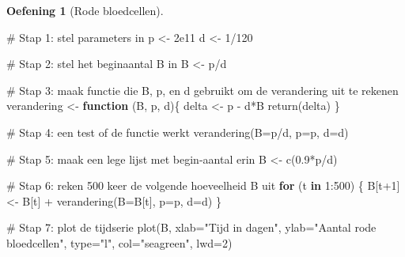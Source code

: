 \documentclass[
  a4paper,
]{scrbook}
\newenvironment{Shaded}{\begin{snugshade}}{\end{snugshade}}
\newcommand{\AttributeTok}[1]{\textcolor[rgb]{0.40,0.45,0.13}{#1}}
\newcommand{\CommentTok}[1]{\textcolor[rgb]{0.37,0.37,0.37}{#1}}
\newcommand{\ControlFlowTok}[1]{\textcolor[rgb]{0.00,0.23,0.31}{\textbf{#1}}}
\newcommand{\DecValTok}[1]{\textcolor[rgb]{0.68,0.00,0.00}{#1}}
\newcommand{\FloatTok}[1]{\textcolor[rgb]{0.68,0.00,0.00}{#1}}
\newcommand{\FunctionTok}[1]{\textcolor[rgb]{0.28,0.35,0.67}{#1}}
\newcommand{\NormalTok}[1]{\textcolor[rgb]{0.00,0.23,0.31}{#1}}
\newcommand{\OtherTok}[1]{\textcolor[rgb]{0.00,0.23,0.31}{#1}}
\newcommand{\SpecialCharTok}[1]{\textcolor[rgb]{0.37,0.37,0.37}{#1}}
\newcommand{\StringTok}[1]{\textcolor[rgb]{0.13,0.47,0.30}{#1}}
\theoremstyle{definition}
\newtheorem{exercise}{Oefening}[chapter]
\theoremstyle{remark}
\begin{document}
\begin{exercise}[Rode
bloedcellen]
\begin{Shaded}
\begin{Highlighting}[]
\CommentTok{\# Stap 1: stel parameters in}
\NormalTok{p }\OtherTok{\textless{}{-}} \FloatTok{2e11}    
\NormalTok{d }\OtherTok{\textless{}{-}} \DecValTok{1}\SpecialCharTok{/}\DecValTok{120}   

\CommentTok{\# Stap 2: stel het beginaantal B in}
\NormalTok{B }\OtherTok{\textless{}{-}}\NormalTok{ p}\SpecialCharTok{/}\NormalTok{d}

\CommentTok{\# Stap 3: maak functie die B, p, en d gebruikt om de verandering uit te rekenen}
\NormalTok{verandering }\OtherTok{\textless{}{-}} \ControlFlowTok{function}\NormalTok{ (B, p, d)\{}
\NormalTok{  delta }\OtherTok{\textless{}{-}}\NormalTok{ p }\SpecialCharTok{{-}}\NormalTok{ d}\SpecialCharTok{*}\NormalTok{B}
  \FunctionTok{return}\NormalTok{(delta)}
\NormalTok{\}}

\CommentTok{\# Stap 4: een test of de functie werkt}
\FunctionTok{verandering}\NormalTok{(}\AttributeTok{B=}\NormalTok{p}\SpecialCharTok{/}\NormalTok{d, }\AttributeTok{p=}\NormalTok{p, }\AttributeTok{d=}\NormalTok{d) }

\CommentTok{\# Stap 5: maak een lege lijst met begin{-}aantal erin}
\NormalTok{B }\OtherTok{\textless{}{-}} \FunctionTok{c}\NormalTok{(}\FloatTok{0.9}\SpecialCharTok{*}\NormalTok{p}\SpecialCharTok{/}\NormalTok{d)}

\CommentTok{\# Stap 6: reken 500 keer de volgende hoeveelheid B uit}
\ControlFlowTok{for}\NormalTok{ (t }\ControlFlowTok{in} \DecValTok{1}\SpecialCharTok{:}\DecValTok{500}\NormalTok{) \{}
\NormalTok{  B[t}\SpecialCharTok{+}\DecValTok{1}\NormalTok{] }\OtherTok{\textless{}{-}}\NormalTok{ B[t] }\SpecialCharTok{+} \FunctionTok{verandering}\NormalTok{(}\AttributeTok{B=}\NormalTok{B[t], }\AttributeTok{p=}\NormalTok{p, }\AttributeTok{d=}\NormalTok{d)}
\NormalTok{\}}

\CommentTok{\# Stap 7: plot de tijdserie}
\FunctionTok{plot}\NormalTok{(B, }\AttributeTok{xlab=}\StringTok{"Tijd in dagen"}\NormalTok{, }\AttributeTok{ylab=}\StringTok{"Aantal rode bloedcellen"}\NormalTok{, }\AttributeTok{type=}\StringTok{"l"}\NormalTok{, }\AttributeTok{col=}\StringTok{"seagreen"}\NormalTok{, }\AttributeTok{lwd=}\DecValTok{2}\NormalTok{)}
\end{Highlighting}
\end{Shaded}


\end{exercise}
\end{document}
